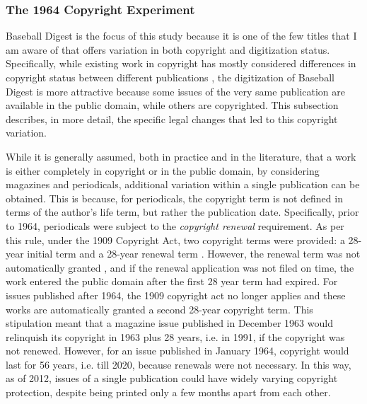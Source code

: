 \documentclass[11pt]{article}
\begin{document}
\subsubsection{The 1964 Copyright Experiment}

Baseball Digest is the focus of this study because it is one of the few titles that I am aware of that offers variation in both copyright and digitization status. Specifically, while existing work in copyright has mostly considered differences in copyright status between different publications \citep{reimers_effects_2013, heald_how_2013}, the digitization of Baseball Digest is more attractive because some issues of the very same publication are available in the public domain, while others are copyrighted. This subsection describes, in more detail, the specific legal changes that led to this copyright variation. 

While it is generally assumed, both in practice and in the literature, that a work is either completely in copyright or in the public domain, by considering magazines and periodicals, additional variation within a single publication can be obtained. This is because, for periodicals, the copyright term is not defined in terms of the author's life term, but rather the publication date. Specifically, prior to 1964, periodicals were subject to the \emph{copyright renewal} requirement. As per this rule, under the 1909 Copyright Act, two copyright terms were provided:  a 28-year initial term and a 28-year renewal term \citep{landes_indefinitely_2002-1}. However, the renewal term was not automatically granted \citep{kupferman_renewal_1944}, and if the renewal application was not filed on time, the work entered the public domain after the first 28 year term had expired. For issues published after 1964, the 1909 copyright act no longer applies and these works are automatically granted a second 28-year copyright term. This stipulation meant that a magazine issue published in December 1963 would relinquish its copyright in 1963 plus 28 years, i.e. in 1991, if the copyright was not renewed. However, for an issue published in January 1964, copyright would last for 56 years, i.e. till 2020, because renewals were not necessary. In this way, as of 2012, issues of a single publication could have widely varying copyright protection, despite being printed only a few months apart from each other. 
\end{document}
